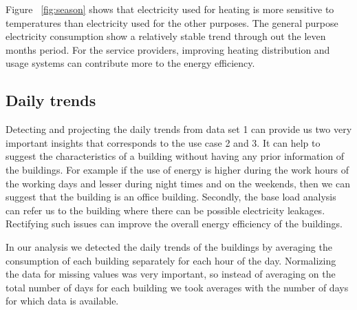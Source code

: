 Figure ~\ref{fig:season} shows that electricity used for heating is more sensitive to temperatures than electricity  used for the other purposes. The general purpose electricity consumption show a relatively stable trend through out the  leven months period. For the service providers, improving heating distribution and usage systems can contribute more to the energy efficiency. 

\subsection{Daily trends}
Detecting and projecting the daily trends from data set 1 can provide us two very important insights that corresponds to the use case 2 and 3. It can help to suggest the characteristics of a building without having any prior information of the buildings. For example if the use of energy is higher during the work hours of the working days and lesser during night times and on the weekends, then we can suggest that the building is an office building. Secondly, the base load analysis can refer us to the building where there can be possible electricity leakages. Rectifying such issues can improve the overall energy efficiency of the buildings.

In our analysis we detected the daily trends of the buildings by averaging the consumption of each building separately for each hour of the day. Normalizing the data for missing values was very important, so instead of averaging on the total number of days for each building we took averages with the number of days for which data is available. 


